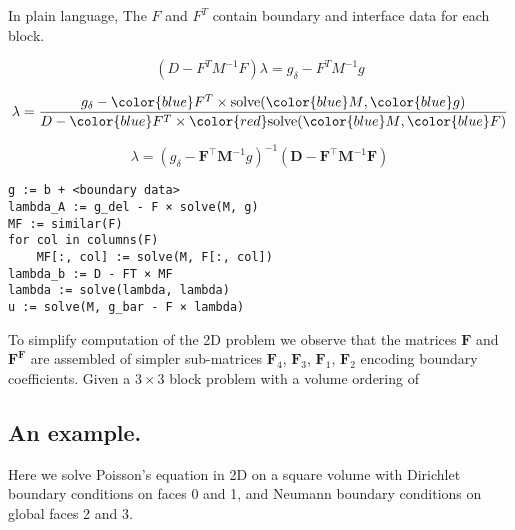 In plain language, The $F$ and $F^T$ contain boundary and interface data 
for each block. 

\begin{equation}
(D - F^T M^{-1} F) \lambda = g_\delta - F^T M^{-1} g
\end{equation}

\begin{equation}
 \lambda = \frac{g_\delta - {\color{blue}F^T} \times \text{solve}({\color{blue}M}, {\color{blue}g})}{D - {\color{blue}F^T} \times {\color{red}\text{solve}}({\color{blue}M}, {\color{blue}F})}
\end{equation}

\begin{equation}
    \lambda = (g_{\delta} - \textbf{F}^{\intercal} \textbf{M}^{-1} g)^{-1} (\textbf{D} - \textbf{F}^{\intercal} \textbf{M}^{-1} \textbf{F})
\end{equation}

\begin{lstlisting}
g := b + <boundary data>
lambda_A := g_del - F × solve(M, g)
MF := similar(F)
for col in columns(F)
    MF[:, col] := solve(M, F[:, col])
lambda_b := D - FT × MF
lambda := solve(lambda, lambda)
u := solve(M, g_bar - F × lambda)
\end{lstlisting}



To simplify computation of the 2D problem we observe that the matrices $\textbf{F}$ and $\textbf{F}^\textbf{F}$ are assembled of simpler sub-matrices $\textbf{F}_{4}$, $\textbf{F}_3$, $\textbf{F}_1$, $\textbf{F}_{2}$ encoding boundary coefficients. Given a $3 \times 3$ block problem with a volume ordering of 

\subsection{An example.}

\noindent 
Here we solve Poisson's equation in 2D on a square volume with Dirichlet boundary conditions on faces 0 and 1, and Neumann boundary conditions on global faces 2 and 3. 

